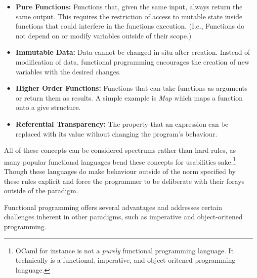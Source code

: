 \documentclass{l4proj}
\begin{document}
\begin{itemize}
    \item \textbf{Pure Functions:} Functions that, given the same input, always return the same output.
    This requires the restriction of access to mutable state inside functions that could interfere in the functions execution.
    (I.e., Functions do not depend on or modify variables outside of their scope.)
    \item \textbf{Immutable Data:} Data cannot be changed in-situ after creation.
    Instead of modification of data, functional programming encourages the creation of new variables with the desired changes.
    \item \textbf{Higher Order Functions:} Functions that can take functions as arguments or return them as results.
    A simple example is \emph{Map} which maps a function onto a give structure.
    \item \textbf{Referential Transparency:} The property that an expression can be replaced with its value without changing the program's behaviour. 
\end{itemize}

All of these concepts can be considered spectrums rather than hard rules, as many popular functional languages bend these concepts for usabilities sake.\footnote{OCaml for instance is not a \emph{purely} functional programming language. It technically is a functional, imperative, and object-oritened programming language.}
Though these languages do make behaviour outside of the norm specified by these rules explicit and force the programmer to be deliberate with their forays outside of the paradigm.

Functional programming offers several advantages and addresses certain challenges inherent in other paradigms, such as imperative and object-oritened programming. 
\end{document}

